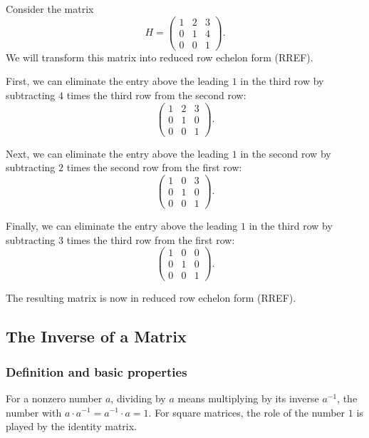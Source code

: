 \begin{example}\label{L1-ex:H}
    Consider the matrix
    \[H = \begin{pmatrix}
        1 & 2 & 3 \\
        0 & 1 & 4 \\
        0 & 0 & 1
    \end{pmatrix}.\]
    We will transform this matrix into reduced row echelon form (RREF).

    First, we can eliminate the entry above the leading $1$ in the third row by subtracting $4$ times the third row from the second row:
    \[\begin{pmatrix}
        1 & 2 & 3 \\
        0 & 1 & 0 \\
        0 & 0 & 1
    \end{pmatrix}.\]

    Next, we can eliminate the entry above the leading $1$ in the second row by subtracting $2$ times the second row from the first row:
    \[\begin{pmatrix}
        1 & 0 & 3 \\
        0 & 1 & 0 \\
        0 & 0 & 1
    \end{pmatrix}.\]

    Finally, we can eliminate the entry above the leading $1$ in the third row by subtracting $3$ times the third row from the first row:
    \[\begin{pmatrix}
        1 & 0 & 0 \\
        0 & 1 & 0 \\
        0 & 0 & 1
    \end{pmatrix}.\]

    The resulting matrix is now in reduced row echelon form (RREF).
\end{example}

\subsection{The Inverse of a Matrix}\label{L1-subsec:inverse}

\subsubsection{Definition and basic properties}

For a nonzero number $a$, dividing by $a$ means multiplying by its inverse $a^{-1}$, the number with $a \cdot a^{-1} = a^{-1} \cdot a = 1$. For square matrices, the role of the number $1$ is played by the identity matrix.

